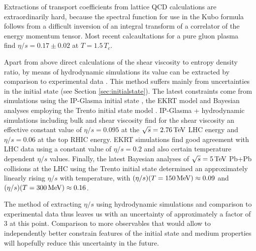 Extractions of transport coefficients from lattice QCD calculations \cite{Nakamura:2004sy,Meyer:2007ic,Pasztor:2018yae} are extraordinarily hard, because the spectral function for use in the Kubo formula follows from a difficult inversion of an integral transform of a correlator of the energy momentum tensor. Most recent calcaultations for a pure gluon plasma find $\eta/s=0.17\pm 0.02$ at $T=1.5\,T_c$.

Apart from above direct calculations of the shear viscosity to entropy density ratio, by means of hydrodynamic simulations its value can be extracted by comparison to experimental data \cite{Gale:2013da,Heinz:2013th}. This method suffers mainly from uncertainties in the initial state (see Section \ref{sec:initialstate}). The latest constraints come from simulations using the IP-Glasma initial state \cite{Schenke:2012wb,Schenke:2012fw}, the EKRT model \cite{Niemi:2015qia} and Bayesian analyses employing the Trento initial state model \cite{Moreland:2018gsh}. IP-Glasma + hydrodynamic simulations including bulk and shear viscosity find for the shear viscosity an effective constant value of $\eta/s=0.095$ at the $\sqrt{s}=2.76\,{\rm TeV}$ LHC energy and $\eta/s=0.06$ at the top RHIC energy. EKRT simulations find good agreement with LHC data using a constant value of $\eta/s=0.2$ and also certain temperature dependent $\eta/s$ values. Finally, the latest Bayesian analyses of $\sqrt{s}=5\,{\rm TeV}$ Pb+Pb collisions at the LHC using the Trento initial state determined an approximately linearly rising $\eta/s$ with temperature, with $(\eta/s)(T=150\,{\rm MeV})\approx 0.09$ and $(\eta/s)(T=300\,{\rm MeV})\approx 0.16$.

The method of extracting $\eta/s$ using hydrodynamic simulations and comparison to experimental data thus leaves us with an uncertainty of approximately a factor of $3$ at this point. Comparison to more observables that would allow to independently better constrain features of the initial state and medium properties will hopefully reduce this uncertainty in the future. 


